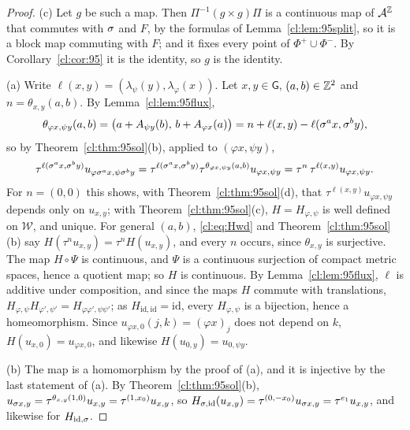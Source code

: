 \begin{proof}
(c) Let $g$ be such a map. Then $\Pi^{-1}(g\times g)\Pi$ is a continuous map of $\mathcal{A}^{\mathbb{Z}}$ that commutes with $\sigma$ and $F$, by the formulas of Lemma~\ref{cl:lem:95split}, so it is a block map commuting with $F$; and it fixes every point of $\Phi^+\cup\Phi^-$. By Corollary~\ref{cl:cor:95} it is the identity, so $g$ is the identity.

(a) Write $\ell(x,y)=(\lambda_\psi(y),\lambda_\varphi(x))$. Let $x,y\in \mathsf G$, $(a,b)\in\mathbb{Z}^2$ and $n=\theta_{x,y}(a,b)$. By Lemma~\ref{cl:lem:95flux},
\[
\theta_{\varphi x,\psi y}(a,b)=\bigl(a+A_{\psi y}(b),\,b+A_{\varphi x}(a)\bigr)=n+\ell(x,y)-\ell(\sigma^ax,\sigma^by),
\]
so by Theorem~\ref{cl:thm:95sol}(b), applied to $(\varphi x,\psi y)$,
\begin{equation}\label{cl:eq:Hwd}
\tau^{\ell(\sigma^ax,\sigma^by)}u_{\varphi\sigma^ax,\psi\sigma^by}=\tau^{\ell(\sigma^ax,\sigma^by)}\tau^{\theta_{\varphi x,\psi y}(a,b)}u_{\varphi x,\psi y}=\tau^{n}\,\tau^{\ell(x,y)}u_{\varphi x,\psi y}.
\end{equation}
For $n=(0,0)$ this shows, with Theorem~\ref{cl:thm:95sol}(d), that $\tau^{\ell(x,y)}u_{\varphi x,\psi y}$ depends only on $u_{x,y}$; with Theorem~\ref{cl:thm:95sol}(c), $H=H_{\varphi,\psi}$ is well defined on $\mathcal W$, and unique. For general $(a,b)$, \eqref{cl:eq:Hwd} and Theorem~\ref{cl:thm:95sol}(b) say $H(\tau^nu_{x,y})=\tau^nH(u_{x,y})$, and every $n$ occurs, since $\theta_{x,y}$ is surjective. The map $H\circ\Psi$ is continuous, and $\Psi$ is a continuous surjection of compact metric spaces, hence a quotient map; so $H$ is continuous. By Lemma~\ref{cl:lem:95flux}, $\ell$ is additive under composition, and since the maps $H$ commute with translations, $H_{\varphi,\psi}H_{\varphi',\psi'}=H_{\varphi\varphi',\psi\psi'}$; as $H_{\mathrm{id},\mathrm{id}}=\mathrm{id}$, every $H_{\varphi,\psi}$ is a bijection, hence a homeomorphism. Since $u_{\varphi x,0}(j,k)=(\varphi x)_j$ does not depend on $k$, $H(u_{x,0})=u_{\varphi x,0}$, and likewise $H(u_{0,y})=u_{0,\psi y}$.

(b) The map is a homomorphism by the proof of (a), and it is injective by the last statement of (a). By Theorem~\ref{cl:thm:95sol}(b), $u_{\sigma x,y}=\tau^{\theta_{x,y}(1,0)}u_{x,y}=\tau^{(1,x_0)}u_{x,y}$, so $H_{\sigma,\mathrm{id}}(u_{x,y})=\tau^{(0,-x_0)}u_{\sigma x,y}=\tau^{e_1}u_{x,y}$, and likewise for $H_{\mathrm{id},\sigma}$.


\end{proof}

